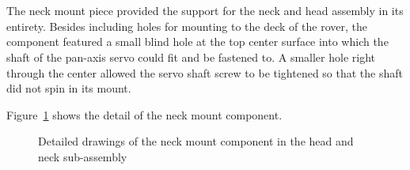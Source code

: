       \\\\
        The neck mount piece provided the support for the neck and head assembly in its entirety. Besides including holes for mounting to the deck of the rover, the component featured a small blind hole at the top center surface into which the shaft of the pan-axis servo could fit and be fastened to. A smaller hole right through the center allowed the servo shaft screw to be tightened so that the shaft did not spin in its mount.
        
        Figure~\ref{fig:mechDesign-neckMount} shows the detail of the neck mount component.

        \begin{figure}[h!]
        \centering
        \caption[Detailed drawings of the neck mount component in the head and neck sub-assembly]{Detailed drawings of the neck mount component in the head and neck sub-assembly}
        \label{fig:mechDesign-neckMount}
        \end{figure}

